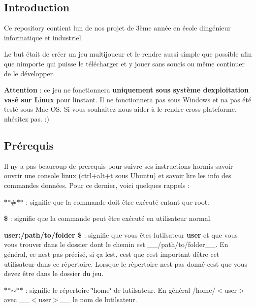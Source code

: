

\subsection*{Introduction}

Ce repository contient l\textquotesingle{}un de nos projet de 3ème année en école d\textquotesingle{}ingénieur informatique et industriel.

Le but était de créer un jeu multijoueur et le rendre aussi simple que possible afin que n\textquotesingle{}importe qui puisse le télécharger et y jouer sans soucis ou même continuer de le développer.

{\bfseries Attention} \+: ce jeu ne fonctionnera {\bfseries uniquement sous système d\textquotesingle{}exploitation vasé sur Linux} pour l\textquotesingle{}instant. Il ne fonctionnera pas sous Windows et n\textquotesingle{}a pas été testé sous Mac OS. Si vous souhaitez nous aider à le rendre cross-\/plateforme, n\textquotesingle{}hésitez pas. \+:)

\subsection*{Prérequis}

Il n\textquotesingle{}y a pas beaucoup de prerequis pour suivre ses instructions hormis savoir ouvrir une console linux (ctrl+alt+t sous Ubuntu) et savoir lire les info des commandes données. Pour ce dernier, voici quelques rappels \+:
\begin{DoxyItemize}
\item $\ast$$\ast$\#$\ast$$\ast$ \+: signifie que la commande doit être exécuté entant que root.
\item {\bfseries \$} \+: signifie que la commande peut être exécuté en utilisateur normal.
\item {\bfseries user\+:/path/to/folder \$} \+: signifie que vous êtes l\textquotesingle{}utilsateur {\bfseries user} et que vous vous trouver dans le dossier dont le chemin est \+\_\+\+\_\+/path/to/folder\+\_\+\+\_\+. En général, ce n\textquotesingle{}est pas précisé, si ça l\textquotesingle{}est, c\textquotesingle{}est que c\textquotesingle{}est important d\textquotesingle{}être cet utilisateur dans ce répertoire. Lorsque le répertoire n\textquotesingle{}est pas donné c\textquotesingle{}est que vous devez être dans le dossier du jeu.
\item $\ast$$\ast$$\sim$$\ast$$\ast$ \+: signifie le répertoire \char`\"{}home\char`\"{} de l\textquotesingle{}utilsateur. En général /home/$<$user$>$ avec \+\_\+\+\_\+$<$user$>$\+\_\+\+\_\+ le nom de l\textquotesingle{}utilsateur.
\end{DoxyItemize}

